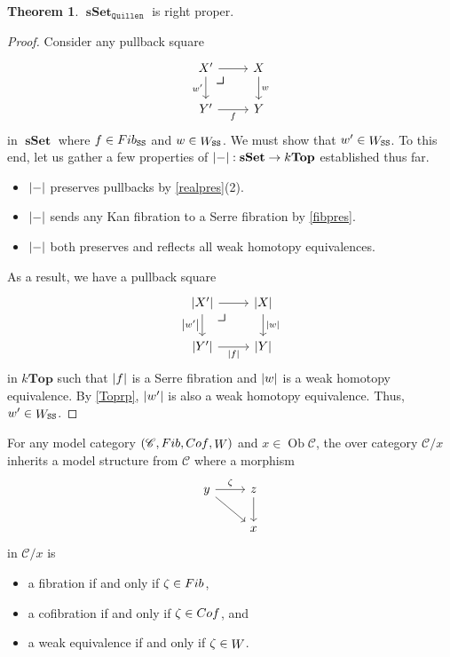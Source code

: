 \documentclass[10pt,letterpaper,cm]{nupset}
\theoremstyle{definition}
\theoremstyle{theorem}
\newtheorem{theorem}[definition]{Theorem}
\theoremstyle{remark}
\DeclareMathOperator{\ob}{Ob}
\newcommand{\0}{\mathbf{0}}
\newcommand{\1}{\mathbf{1}}
\newcommand{\2}{\mathbf{2}}
\DeclareMathOperator{\sset}{\mathbf{sSet}}
\renewcommand{\c}{\mathscr{C}}
\DeclareMathOperator{\fib}{\mathnormal{Fib}}
\DeclareMathOperator{\cof}{\mathnormal{Cof}}
\DeclareMathOperator{\we}{\mathnormal{W}}
\newcommand{\bi}{\begin{itemize}}
\newcommand{\ei}{\end{itemize}}
\begin{document}
\begin{theorem}\label{RProp}
$\sset_{\mathtt{Quillen}}$ is right proper.
\end{theorem}
\begin{proof}
Consider any pullback square
\[
\begin{tikzcd}
X' \arrow[r]
\arrow[dr, phantom, "\scalebox{1.5}{\color{black}$\lrcorner$}" , very near start, color=black]
 \arrow[d, "w'"'] & X \arrow[d, "w"] \\
Y' \arrow[r, "f"']            & Y               
\end{tikzcd}
\] in $\sset$ where $f\in \fib_{\mathtt{SS}}$ and $w \in \we_{\mathtt{SS}}$. We must show that $w' \in \we_{\mathtt{SS}}$.
 To this end, let us gather a few properties of $\mleft\lvert{-}\mright\rvert : \sset \to k\mathbf{Top}$ established thus far.

\bi
\item $\mleft\lvert{-}\mright\rvert$ preserves pullbacks by \cref{realpres}(2).
\item $\mleft\lvert{-}\mright\rvert$ sends any Kan fibration to a Serre fibration by \cref{fibpres}.
\item $\mleft\lvert{-}\mright\rvert$ both preserves and reflects all weak homotopy equivalences.
\ei

As a result, we have a pullback square
\[
\begin{tikzcd}
\mleft\lvert{X'}\mright\rvert \arrow[r]
\arrow[dr, phantom, "\scalebox{1.5}{\color{black}$\lrcorner$}" , very near start, color=black] 
 \arrow[d, "\mleft\lvert{w'}\mright\rvert"'] & \mleft\lvert{X}\mright\rvert \arrow[d, "\mleft\lvert{w}\mright\rvert"] \\
\mleft\lvert{Y'}\mright\rvert \arrow[r, "\mleft\lvert{f}\mright\rvert"']            & \mleft\lvert{Y}\mright\rvert                                        
\end{tikzcd}
\]  in $k\mathbf{Top}$ such that $\mleft\lvert{f}\mright\rvert$ is a Serre fibration and $\mleft\lvert{w}\mright\rvert$ is a weak homotopy equivalence. By \cref{Toprp}, $\mleft\lvert{w'}\mright\rvert$ is also a weak homotopy equivalence. Thus, $w' \in  \we_{\mathtt{SS}}$.
\end{proof}

\smallskip

For any model category $\mleft(\c, \fib, \cof, \we\mright)$ and $x\in \ob{\c}$, the over category $\c/x$ inherits a model structure from $\c$ where a  morphism
\[
\begin{tikzcd}
y \arrow[rd] \arrow[r, "\zeta"] & z \arrow[d] \\
                       & x          
\end{tikzcd}
\]
in $\c/x$ is
\bi
\item a fibration if and only if $\zeta \in \fib$,
\item a cofibration if and only if $\zeta \in \cof$, and
\item a weak equivalence if and only if $\zeta \in \we$.
\ei
\end{document}
